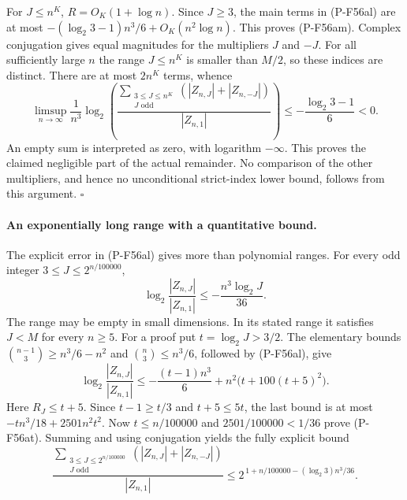 For $J\le n^K$, $R=O_K(1+\log n)$.
Since $J\ge3$, the main terms in (P-F56al) are at most
$-(\log_2 3-1)n^3/6+O_K(n^2\log n)$.
This proves (P-F56am). Complex conjugation gives equal
magnitudes for the multipliers $J$ and $-J$.
For all sufficiently large $n$ the range $J\le n^K$
is smaller than $M/2$, so these indices are distinct.
There are at most $2n^K$ terms, whence
\[
 \limsup_{n\to\infty}\frac1{n^3}\log_2
 \left(
 \frac{\displaystyle\sum_{\substack{3\le J\le n^K\\J\text{ odd}}}
       (|Z_{n,J}|+|Z_{n,-J}|)}{|Z_{n,1}|}
 \right)
 \le-\frac{\log_2 3-1}{6}<0.
 \tag{P-F56as}
\]
An empty sum is interpreted as zero, with logarithm
$-\infty$. This proves the claimed negligible part
of the actual remainder. No comparison of the other
multipliers, and hence no unconditional strict-index
lower bound, follows from this argument.
\hfill$\square$

\paragraph{An exponentially long range with a quantitative bound.}
The explicit error in (P-F56al) gives more than polynomial
ranges. For every odd integer $3\le J\le2^{n/100000}$,
\[
       \log_2\frac{|Z_{n,J}|}{|Z_{n,1}|}
                      \le-\frac{n^3\log_2 J}{36}.
 \tag{P-F56at}
\]
The range may be empty in small dimensions. In its stated
range it satisfies $J<M$ for every $n\ge5$.
For a proof put $t=\log_2J>3/2$. The elementary bounds
$\binom{n-1}{3}\ge n^3/6-n^2$ and
$\binom n3\le n^3/6$, followed by (P-F56al), give
\[
 \log_2\frac{|Z_{n,J}|}{|Z_{n,1}|}
 \le-\frac{(t-1)n^3}{6}
                      +n^2\bigl(t+100(t+5)^2\bigr).
\]
Here $R_J\le t+5$. Since $t-1\ge t/3$ and
$t+5\le5t$, the last bound is at most
$-tn^3/18+2501n^2t^2$.
Now $t\le n/100000$ and $2501/100000<1/36$ prove
(P-F56at). Summing and using conjugation yields the
fully explicit bound
\[
 \frac{\displaystyle\sum_{\substack{3\le J\le2^{n/100000}\\
                                  J\text{ odd}}}
       (|Z_{n,J}|+|Z_{n,-J}|)}{|Z_{n,1}|}
 \le 2^{\,1+n/100000-(\log_2 3)n^3/36}.
 \tag{P-F56au}
\]

